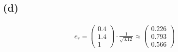 \documentclass{article}
\begin{document}
\subsection*{(d)}

 \begin{align}
     e_r=
     \begin{pmatrix}
        0.4\\
        1.4\\
        1
    \end{pmatrix}
     \cdot\frac{1}{\sqrt{3.12}}
     \approx
    \begin{pmatrix}
        0.226\\
        0.793\\
        0.566
    \end{pmatrix}
\end{align}
\end{document}

